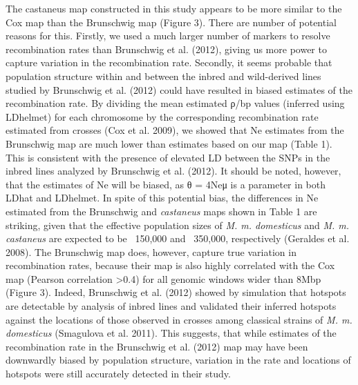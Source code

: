The castaneus map constructed in this study appears to be more similar to the Cox map than the Brunschwig map (Figure 3). There are number of potential reasons for this. Firstly, we used a much larger number of markers to resolve recombination rates than Brunschwig et al. (2012), giving us more power to capture variation in the recombination rate. Secondly, it seems probable that population structure within and between the inbred and wild-derived lines studied by Brunschwig et al. (2012) could have resulted in biased estimates of the recombination rate. By dividing the mean estimated ρ/bp values (inferred using LDhelmet) for each chromosome by the corresponding recombination rate estimated from crosses (Cox et al. 2009), we showed that Ne estimates from the Brunschwig map are much lower than estimates based on our map (Table 1). This is consistent with the presence of elevated LD between the SNPs in the inbred lines analyzed by Brunschwig et al. (2012). It should be noted, however, that the estimates of Ne will be biased, as θ = 4Neμ is a parameter in both LDhat and LDhelmet. In spite of this potential bias, the differences in Ne estimated from the Brunschwig and \textit{castaneus} maps shown in Table 1 are striking, given that the effective population sizes of \emph{M. m. domesticus} and \emph{M. m. castaneus} are expected to be ~150,000 and ~350,000, respectively (Geraldes et al. 2008). The Brunschwig map does, however, capture true variation in recombination rates, because their map is also highly correlated with the Cox map (Pearson correlation >0.4) for all genomic windows wider than 8Mbp (Figure 3). Indeed, Brunschwig et al. (2012) showed by simulation that hotspots are detectable by analysis of inbred lines and validated their inferred hotspots against the locations of those observed in crosses among classical strains of \emph{M. m. domesticus} (Smagulova et al. 2011). This suggests, that while estimates of the recombination rate in the Brunschwig et al. (2012) map may have been downwardly biased by population structure, variation in the rate and locations of hotspots were still accurately detected in their study.
 
